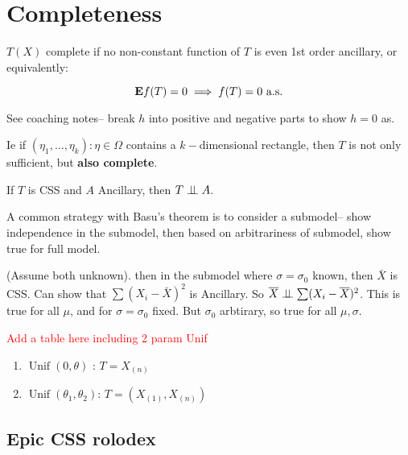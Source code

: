 \documentclass{article}
\newcommand\myworries[1]{\textcolor{red}{#1}}
\newcommand{\Unif}{\operatorname{Unif}}
\begin{document}
\section{Completeness} 
\begin{definition}[Completeness]
$T(X)$ complete if no non-constant function of $T$ is even 1st order ancillary, or equivalently:

$$\mathbf{E} f(T) = 0 \implies f(T) = 0 \text{ a.s}.$$
\end{definition}
\begin{example}[$X_i\sim\Unif(0,\theta)$]
See coaching notes-- break $h$ into positive and negative parts to show $h = 0$ as. 	
\end{example}
\begin{theorem}
Ie if $(\eta_1,\ldots, \eta_k): \eta \in \Omega$ contains a $k-$dimensional rectangle, then $T$ is not only sufficient, but \textbf{also complete}.
\end{theorem}
\begin{theorem}
If $T$ is CSS and $A$ Ancillary, then $T\perp \! \! \! \perp A$. 
\end{theorem}
A common strategy with Basu's theorem is to consider a submodel-- show independence in the submodel, then based on arbitrariness of submodel, show true for full model. 
\begin{example}
(Assume both unknown). then in the submodel where $\sigma = \sigma_0$ known, then $\bar X$ is CSS. Can show that $\sum (X_i - \bar X)^2$ is Ancillary. So $\overline X \perp \! \! \! \perp \sum (X_i - \overline X)^2$. This is true for all $\mu$, and for $\sigma = \sigma_0$ fixed. But $\sigma_0$ arbtirary, so true for all $\mu,\sigma$. 	
\end{example}
\myworries{Add a table here including 2 param Unif}
\begin{enumerate}
	\item $\Unif(0,\theta)$ : $T= X_{(n)}$
	\item $\Unif(\theta_1, \theta_2)$: $T = (X_{(1)}, X_{(n)})$
\end{enumerate}




\subsection{Epic CSS rolodex}
\end{document}
